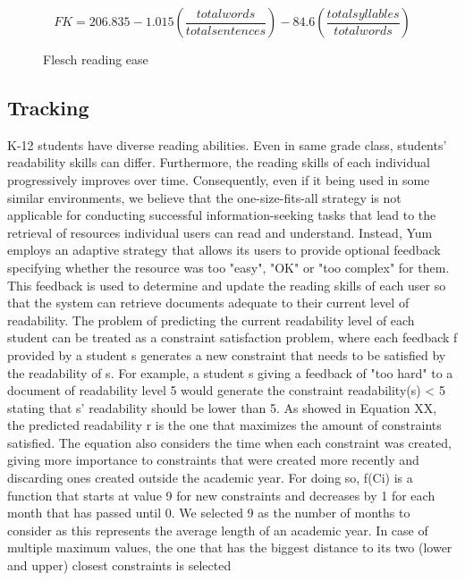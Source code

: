 \documentclass{sig-alternate-05-2015}
\begin{document}
\begin{figure}[h]
\[ FK = 206.835 -1.015 ( \frac{total words}{total sentences}  ) -84.6 ( \frac{total syllables}{total words}) \]
\caption{Flesch reading ease}
\label{fig:flesh}
\end{figure}

\subsection{Tracking}
K-12 students have diverse reading abilities. Even in same grade class, students' readability skills can differ\cite{Bow92}. Furthermore, the reading skills of each individual progressively improves over time\cite{sh13}. Consequently, even if it being used in some similar environments\cite{Ust14}, we believe that the one-size-fits-all strategy is not applicable for conducting successful information-seeking tasks that lead to the retrieval of resources individual users can read and understand. Instead, Yum employs an adaptive strategy that allows its users to provide optional feedback specifying whether the resource was too "easy", "OK" or "too complex" for them. This feedback is used to determine and update the reading skills of each user so that the system can retrieve documents adequate to their current level of readability.    
The problem of predicting the current readability level of each student can be treated as a constraint satisfaction problem, where each feedback f provided by a student s generates  a new constraint that needs to be satisfied by the readability  of  s. For example, a student s giving a feedback of "too hard" to a document of readability level 5 would generate the constraint readability(s) < 5 stating that s' readability should be lower than 5. As showed in Equation XX, the predicted readability  r is the one that maximizes the amount of constraints satisfied. The equation also considers the time when each constraint was created, giving more importance to constraints that were created more recently and discarding ones created outside the academic year. For doing so, f(Ci) is a function that starts at value 9 for new constraints and decreases by 1 for each month  that has passed until 0. We selected 9 as the number of months to consider as this represents the average length of an academic year. In case of multiple maximum values, the one that has the biggest distance to its two (lower and upper) closest constraints is selected 



\end{document}
